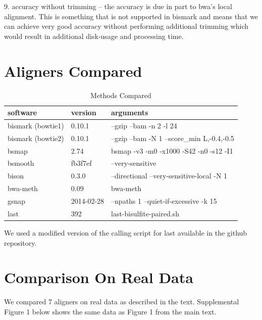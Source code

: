 \documentclass[12pt]{article}
\begin{document}
9. accuracy without trimming -- the accuracy is due in part to bwa's local
   alignment. This is something that is not supported in bismark and means that
   we can achieve very good accuracy without performing additional trimming
   which would result in additional disk-usage and processing time.


\section{Aligners Compared}

\begin{table}[!htp]
\caption{Methods Compared}
{\begin{tabular}{lll}\\\toprule
software & version & arguments\\\midrule
bismark (bowtie1) & 0.10.1 & --gzip --bam -n 2 -l 24\\
bismark (bowtie2) & 0.10.1 & --gzip --bam -N 1 --score\_min L,-0.4,-0.5\\ 
bsmap & 2.74 & bsmap -v3 -m0 -x1000 -S42 -n0 -s12 -I1\\
bsmooth & fb3f7ef & --very-sensitive\\
bison & 0.3.0 & --directional --very-sensitive-local -N 1\\
bwa-meth & 0.09 & bwa-meth\\
gsnap & 2014-02-28 & --npaths 1 --quiet-if-excessive -k 15\\
last & 392 & last-bisulfite-paired.sh\\\bottomrule
\end{tabular}}
\end{table}
We used a modified version of the calling script for last available in the
github repository.

\section{Comparison On Real Data}

We compared 7 aligners on real data as described in the text. Supplemental
Figure 1 below shows the same data as Figure 1 from the main text.
\end{document}
